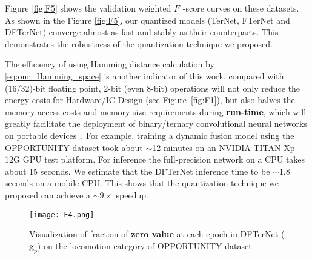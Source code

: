 \documentclass[twoside,twocolumn]{article}
\begin{document}
Figure \ref{fig:F5} shows the validation weighted $F_1$-score curves on these datasets. As shown in the Figure \ref{fig:F5}, our quantized models (TerNet, FTerNet and DFTerNet) converge almost as fast and stably as their counterparts. This demonstrates the robustness of the quantization technique we proposed.

The efficiency of using Hamming distance calculation by \eqref{eq:our_Hamming_space} is another indicator of this work, compared with (16/32)-bit floating point, 2-bit (even 8-bit) operations will not only reduce the energy costs for Hardware/IC Design (see Figure~\ref{fig:F1}), but also halves the memory access costs and memory size requirements during \textbf{run-time}, which will greatly facilitate the deployment of binary/ternary convolutional neural networks on portable devices~\cite{b55}. For example, training a dynamic fusion model using the OPPORTUNITY dataset took about $\sim$12 minutes on an NVIDIA TITAN Xp 12G GPU test platform. For inference the full-precision network on a CPU takes about 15 seconds. We estimate that the DFTerNet inference time to be $\sim$1.8 seconds on a mobile CPU. This shows that the quantization technique we proposed can achieve a $\sim9\times$ speedup.

\begin{figure}
  \centering
  \texttt{[image: F4.png]}\\
  \caption{Visualization of fraction of \textbf{zero value} at each epoch in DFTerNet ($\boldsymbol{g}_p$) on the locomotion category of OPPORTUNITY dataset.}\label{fig:F4}
\end{figure}
\end{document}
